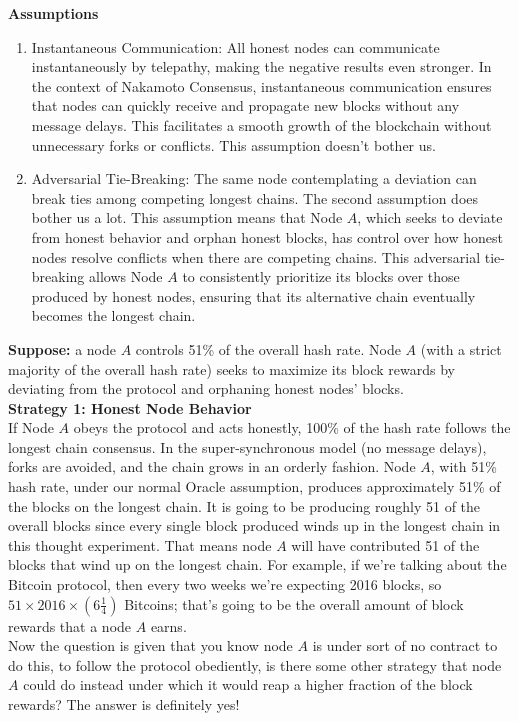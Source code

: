   \textbf{Assumptions}
  \begin{enumerate}
      \item Instantaneous Communication: All honest nodes can communicate instantaneously by telepathy, making the negative results even stronger. In the context of Nakamoto Consensus, instantaneous communication ensures that nodes can quickly receive and propagate new blocks without any message delays. This facilitates a smooth growth of the blockchain without unnecessary forks or conflicts. This assumption doesn't bother us.
      \item Adversarial Tie-Breaking: The same node contemplating a deviation can break ties among competing longest chains. The second assumption does bother us a lot. This assumption means that Node $A$, which seeks to deviate from honest behavior and orphan honest blocks, has control over how honest nodes resolve conflicts when there are competing chains. This adversarial tie-breaking allows Node $A$ to consistently prioritize its blocks over those produced by honest nodes, ensuring that its alternative chain eventually becomes the longest chain.
  \end{enumerate}
  
  \noindent
  \textbf{Suppose:} a node $A$ controls 51\% of the overall hash rate. Node $A$ (with a strict majority of the overall hash rate) seeks to maximize its block rewards by deviating from the protocol and orphaning honest nodes' blocks.
  \\
  \noindent
  \textbf{Strategy 1: Honest Node Behavior}\\
  If Node $A$ obeys the protocol and acts honestly, 100\% of the hash rate follows the longest chain consensus. In the super-synchronous model (no message delays), forks are avoided, and the chain grows in an orderly fashion. Node $A$, with 51\% hash rate, under our normal
  Oracle assumption, produces approximately 51\% of the blocks on the longest chain. It is going to be
  producing roughly 51 of the
  overall blocks since every single block produced winds up in the longest chain in this thought experiment. That means node $A$ will have contributed 51 of the blocks that wind up on the longest chain.
  For example, if we're talking about the Bitcoin protocol, then every two weeks we're expecting 2016 blocks, so $51 \times 2016 \times (6 \frac{1}{4})$ Bitcoins; that's going to be the overall amount of block rewards that a node $A$ earns.\\
  
  Now the question is given that you know node $A$ is under sort of no contract to do this, to follow the protocol obediently, is there some other strategy that node $A$ could do instead under which it would reap a higher fraction of the block rewards? The answer is definitely yes!
  
